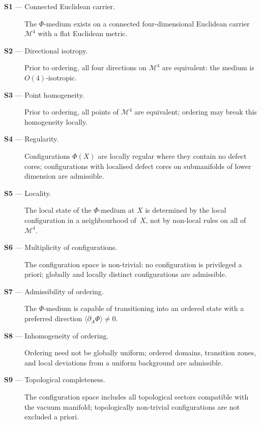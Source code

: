 \documentclass[11pt,a4paper]{article}
\numberwithin{equation}{section}
\begin{document}
\begin{description}
  \item[\textbf{S1} --- Connected Euclidean carrier.]
    The $\Phi$-medium exists on a connected four-dimensional Euclidean
    carrier $\mathcal{M}^4$ with a flat Euclidean metric.

  \item[\textbf{S2} --- Directional isotropy.]
    Prior to ordering, all four directions on $\mathcal{M}^4$ are
    equivalent: the medium is $O(4)$-isotropic.

  \item[\textbf{S3} --- Point homogeneity.]
    Prior to ordering, all points of $\mathcal{M}^4$ are equivalent;
    ordering may break this homogeneity locally.

  \item[\textbf{S4} --- Regularity.]
    Configurations $\Phi(X)$ are locally regular where they contain no
    defect cores; configurations with localised defect cores on
    submanifolds of lower dimension are admissible.

  \item[\textbf{S5} --- Locality.]
    The local state of the $\Phi$-medium at $X$ is determined by the
    local configuration in a neighbourhood of~$X$, not by non-local
    rules on all of~$\mathcal{M}^4$.

  \item[\textbf{S6} --- Multiplicity of configurations.]
    The configuration space is non-trivial: no configuration is
    privileged a priori; globally and locally distinct configurations
    are admissible.

  \item[\textbf{S7} --- Admissibility of ordering.]
    The $\Phi$-medium is capable of transitioning into an ordered state
    with a preferred direction $\langle\partial_A\Phi\rangle \neq 0$.

  \item[\textbf{S8} --- Inhomogeneity of ordering.]
    Ordering need not be globally uniform; ordered domains, transition
    zones, and local deviations from a uniform background are admissible.

  \item[\textbf{S9} --- Topological completeness.]
    The configuration space includes all topological sectors compatible
    with the vacuum manifold; topologically non-trivial configurations
    are not excluded a priori.
\end{description}
\end{document}
